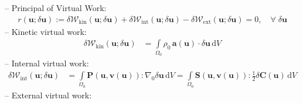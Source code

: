 \documentclass[a4paper,12pt]{report}
\newcommand{\bs}[1]{\boldsymbol{#1}}
\newcommand{\Om}{\mathit{\Omega}}
\begin{document}
-- Principal of Virtual Work:
\begin{equation}
\label{equation-solid-weak-form}
\begin{aligned}
r(\bs{u};\delta\bs{u}) := \delta \mathcal{W}_{\mathrm{kin}}(\bs{u};\delta\bs{u}) + \delta \mathcal{W}_{\mathrm{int}}(\bs{u};\delta\bs{u}) - \delta \mathcal{W}_{\mathrm{ext}}(\bs{u};\delta\bs{u}) = 0, \quad \forall \; \delta\bs{u}\end{aligned}
\end{equation}
-- Kinetic virtual work:
\begin{equation}
\label{equation-deltaw-kin}
\begin{aligned}
\delta \mathcal{W}_{\mathrm{kin}}(\bs{u};\delta\bs{u}) &= \int\limits_{\Om_{0}} \rho_{0}\,\bs{a}(\bs{u}) \cdot \delta\bs{u} \,\mathrm{d}V
\end{aligned}
\end{equation}
-- Internal virtual work:
\begin{equation}
\label{equation-deltaw-int}
\begin{aligned}
\delta \mathcal{W}_{\mathrm{int}}(\bs{u};\delta\bs{u}) &= \int\limits_{\Om_{0}} \bs{P}(\bs{u},\bs{v}(\bs{u})) : \nabla_{0} \delta\bs{u} \,\mathrm{d}V = \int\limits_{\Om_{0}} \bs{S}(\bs{u},\bs{v}(\bs{u})) : \frac{1}{2}\delta\bs{C}(\bs{u}) \,\mathrm{d}V
\end{aligned}
\end{equation}
-- External virtual work:\\
\end{document}
